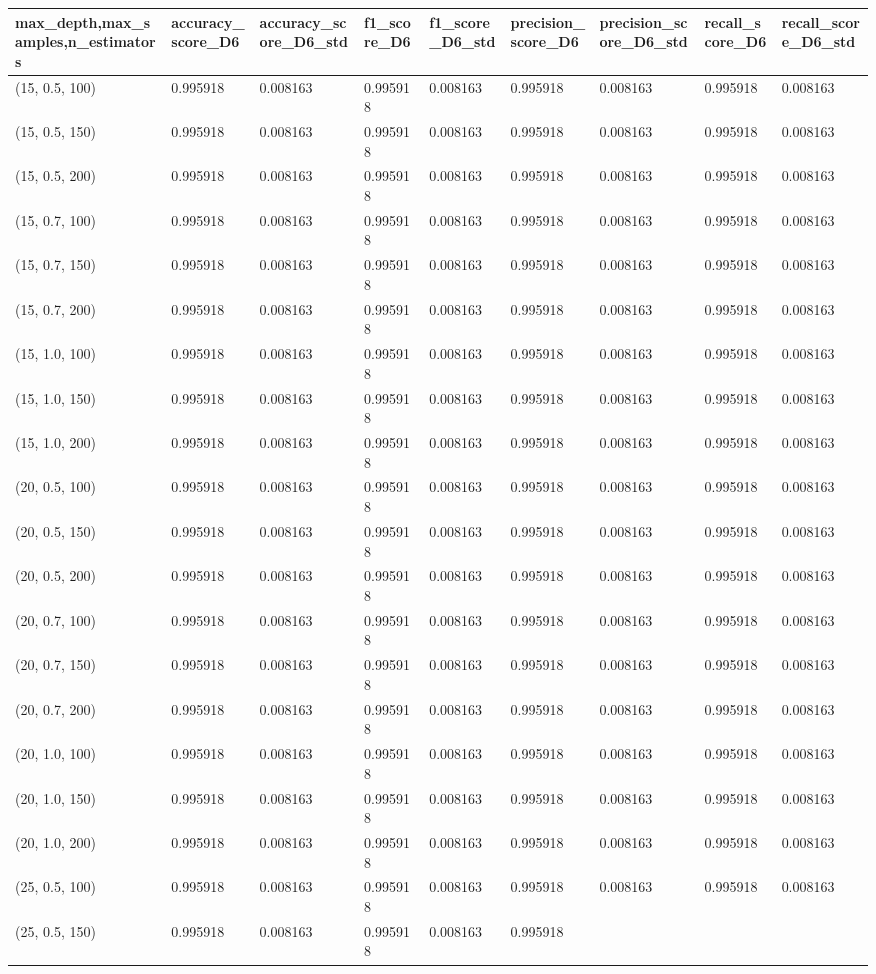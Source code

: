 \documentclass[
  english,
]{article}
\begin{document}
\begin{longtable}[]{@{}lllllllll@{}}
\toprule
max\_depth,max\_samples,n\_estimators & accuracy\_score\_D6 &
accuracy\_score\_D6\_std & f1\_score\_D6 & f1\_score\_D6\_std &
precision\_score\_D6 & precision\_score\_D6\_std & recall\_score\_D6 &
recall\_score\_D6\_std\tabularnewline
\midrule
\endhead
(15, 0.5, 100) & 0.995918 & 0.008163 & 0.995918 & 0.008163 & 0.995918 &
0.008163 & 0.995918 & 0.008163\tabularnewline
(15, 0.5, 150) & 0.995918 & 0.008163 & 0.995918 & 0.008163 & 0.995918 &
0.008163 & 0.995918 & 0.008163\tabularnewline
(15, 0.5, 200) & 0.995918 & 0.008163 & 0.995918 & 0.008163 & 0.995918 &
0.008163 & 0.995918 & 0.008163\tabularnewline
(15, 0.7, 100) & 0.995918 & 0.008163 & 0.995918 & 0.008163 & 0.995918 &
0.008163 & 0.995918 & 0.008163\tabularnewline
(15, 0.7, 150) & 0.995918 & 0.008163 & 0.995918 & 0.008163 & 0.995918 &
0.008163 & 0.995918 & 0.008163\tabularnewline
(15, 0.7, 200) & 0.995918 & 0.008163 & 0.995918 & 0.008163 & 0.995918 &
0.008163 & 0.995918 & 0.008163\tabularnewline
(15, 1.0, 100) & 0.995918 & 0.008163 & 0.995918 & 0.008163 & 0.995918 &
0.008163 & 0.995918 & 0.008163\tabularnewline
(15, 1.0, 150) & 0.995918 & 0.008163 & 0.995918 & 0.008163 & 0.995918 &
0.008163 & 0.995918 & 0.008163\tabularnewline
(15, 1.0, 200) & 0.995918 & 0.008163 & 0.995918 & 0.008163 & 0.995918 &
0.008163 & 0.995918 & 0.008163\tabularnewline
(20, 0.5, 100) & 0.995918 & 0.008163 & 0.995918 & 0.008163 & 0.995918 &
0.008163 & 0.995918 & 0.008163\tabularnewline
(20, 0.5, 150) & 0.995918 & 0.008163 & 0.995918 & 0.008163 & 0.995918 &
0.008163 & 0.995918 & 0.008163\tabularnewline
(20, 0.5, 200) & 0.995918 & 0.008163 & 0.995918 & 0.008163 & 0.995918 &
0.008163 & 0.995918 & 0.008163\tabularnewline
(20, 0.7, 100) & 0.995918 & 0.008163 & 0.995918 & 0.008163 & 0.995918 &
0.008163 & 0.995918 & 0.008163\tabularnewline
(20, 0.7, 150) & 0.995918 & 0.008163 & 0.995918 & 0.008163 & 0.995918 &
0.008163 & 0.995918 & 0.008163\tabularnewline
(20, 0.7, 200) & 0.995918 & 0.008163 & 0.995918 & 0.008163 & 0.995918 &
0.008163 & 0.995918 & 0.008163\tabularnewline
(20, 1.0, 100) & 0.995918 & 0.008163 & 0.995918 & 0.008163 & 0.995918 &
0.008163 & 0.995918 & 0.008163\tabularnewline
(20, 1.0, 150) & 0.995918 & 0.008163 & 0.995918 & 0.008163 & 0.995918 &
0.008163 & 0.995918 & 0.008163\tabularnewline
(20, 1.0, 200) & 0.995918 & 0.008163 & 0.995918 & 0.008163 & 0.995918 &
0.008163 & 0.995918 & 0.008163\tabularnewline
(25, 0.5, 100) & 0.995918 & 0.008163 & 0.995918 & 0.008163 & 0.995918 &
0.008163 & 0.995918 & 0.008163\tabularnewline
(25, 0.5, 150) & 0.995918 & 0.008163 & 0.995918 & 0.008163 & 0.995918 &

\end{longtable}
\end{document}
